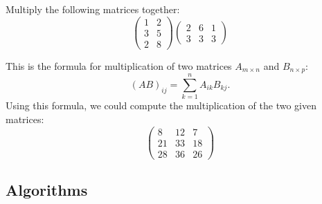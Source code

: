 \documentclass{ximera}
\begin{document}
\begin{question}
Multiply the following matrices together:
\[ \left( \begin{array}{cc}
1 & 2 \\
3 & 5 \\
2 & 8
\end{array} \right)
%
\left( \begin{array}{ccc}
2 & 6 & 1 \\
3 & 3 & 3
\end{array} \right)
\]
\begin{solution}
\end{solution}
This is the formula for multiplication of two matrices $A_{m \times n}$ and $B_{n \times p}$:
\[
    (AB)_{ij} = \sum_{k=1}^n A_{ik}B_{kj}. 
\]
Using this formula, we could compute the multiplication of the two given matrices:
\[
\begin{pmatrix}
8 & 12 & 7 \\
21 & 33 & 18 \\
28 & 36 & 26
\end{pmatrix}
\]
\end{question}

\subsection*{Algorithms}
\end{document}
